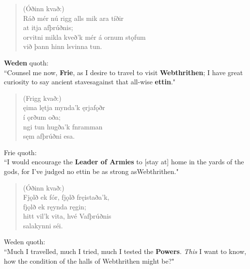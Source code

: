 \bookStart

\begin{verse}
(Óðinn kvað:) \\%
\bva Ráð mér nú rigg \hld alls mik ara tíðir \\%
\ind at itja afþrúðnis; \\%
orvitni mikla \hld kveð'k mér á ornum stǫfum \\%
\ind við þann hinn lsvinna tun.\\%
\end{verse}

\bvb \textbf{Weden} quoth: \\ “Counsel me now, \textbf{Frie}, as I desire to travel to visit \textbf{Webthrithen}; I have great curiosity to say ancient staves\footnotemark[1] against that all-wise \textbf{ettin}." \\

\begin{verse}
(Frigg kvað:) \\%
\bva {}ęima lętja \hld mynda'k ęrjafǫðr \\%
\ind í ǫrðum oða; \\%
ngi tun \hld hugða'k fnramman \\%
\ind sęm afþrúðni esa.\\%
\end{verse}

\bvb Frie quoth: \\ “I would encourage the \textbf{Leader of Armies} to [stay at] home in the yards of the gods, for I've judged no ettin be as strong as\footnotemark[3] Webthrithen." \\

\begin{verse}
(Óðinn kvað:) \\%
\bva Fjǫlð ek fór, \hld fjǫlð fręistaða'k, \\%
\ind fjǫlð ek ręynda ręgin; \\%
hitt vil'k vita, \hld hvé Vafþrúðnis \\%
\ind salakynni séi.\\%
\end{verse}

\bvb Weden quoth: \\ “Much I travelled, much I tried, much I tested the \textbf{Powers}\footnotemark[4]. \emph{This} I want to know, how the condition of the halls of Webthrithen might be?" \\

